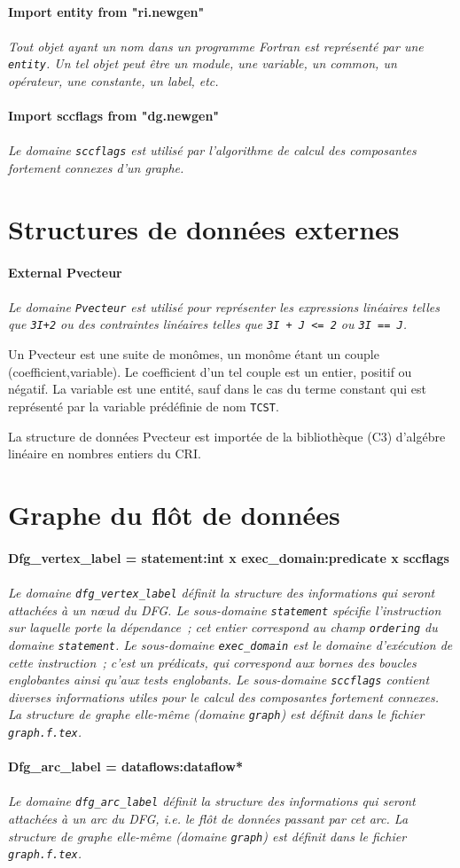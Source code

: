 \documentclass{article}
\newcommand{\domain}[2]{\paragraph{{#1}}\paragraph{}{\em #2}}
\begin{document}
\domain{Import entity from "ri.newgen"}
{Tout objet ayant un nom dans un programme Fortran est repr\'esent\'e par une 
{\tt entity}. Un tel objet peut \^etre un module, une variable, un common, un 
op\'erateur, une constante, un label, etc.}

\domain{Import sccflags from "dg.newgen"}
{Le domaine {\tt sccflags} est utilis\'e par l'algorithme de calcul des 
composantes fortement connexes d'un graphe.}

\section{Structures de donn\'ees externes}

\domain{External Pvecteur}
{Le domaine {\tt Pvecteur} est utilis\'e pour repr\'esenter les expressions 
lin\'eaires telles que {\tt 3I+2} ou des contraintes lin\'eaires telles que 
{\tt 3I + J <= 2} ou {\tt 3I == J}.

Un Pvecteur est une suite de mon\^omes, un mon\^ome \'etant un couple 
(coefficient,variable). Le coefficient d'un tel couple est un entier, positif 
ou n\'egatif. La variable est une entit\'e, sauf dans le cas du terme constant 
qui est repr\'esent\'e par la variable pr\'ed\'efinie de nom {\tt TCST}.

La structure de donn\'ees Pvecteur est import\'ee de la biblioth\`eque (C3) 
d'alg\'ebre lin\'eaire en nombres entiers du CRI.}

\section{Graphe du fl\^ot de donn\'ees}

\domain{Dfg\_vertex\_label = statement:int x exec\_domain:predicate x sccflags}
{Le domaine {\tt dfg\_vertex\_label} d\'efinit la structure des informations 
qui seront attach\'ees \`a un n\oe ud du DFG. Le sous-domaine {\tt statement} 
sp\'ecifie l'instruction sur laquelle porte la d\'e\-pen\-dance~; cet entier 
correspond au champ {\tt ordering} du domaine {\tt statement}. Le sous-domaine 
{\tt exec\_domain} est le domaine d'ex\'ecution de cette instruction~; c'est un
pr\'edicats, qui correspond aux bornes
des boucles englobantes ainsi qu'aux tests englobants. Le sous-domaine 
{\tt sccflags} contient diverses informations utiles pour le calcul des 
composantes fortement connexes. La structure de graphe elle-m\^eme (domaine 
{\tt graph}) est d\'efinit dans le fichier {\tt graph.f.tex}.}

\domain{Dfg\_arc\_label = dataflows:dataflow*}
{Le domaine {\tt dfg\_arc\_label} d\'efinit la structure des informations qui 
seront attach\'ees \`a un arc du DFG, {\em i.e.} le fl\^ot de donn\'ees 
passant par cet arc. La structure de graphe elle-m\^eme (domaine {\tt graph}) 
est d\'efinit dans le fichier {\tt graph.f.tex}.}
\end{document}
